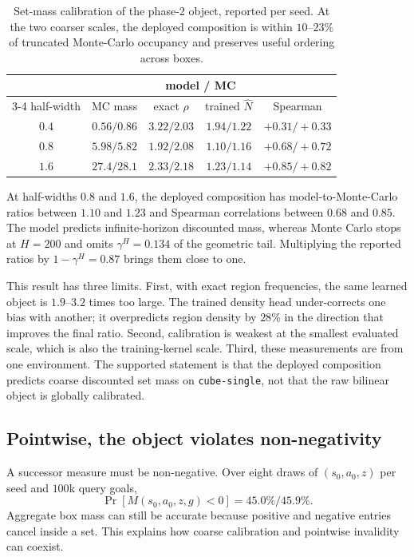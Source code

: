 \documentclass{article}
\begin{document}
\begin{table}[t]
\centering\small
\begin{tabular}{c c c c c}
\toprule
& & \multicolumn{2}{c}{model / MC} & \\
\cmidrule(lr){3-4}
half-width & MC mass & exact $\rho$ & trained $\hat N$ & Spearman \\
\midrule
$0.4$ & $0.56/0.86$ & $3.22/2.03$ & $1.94/1.22$ & $+0.31/+0.33$ \\
$0.8$ & $5.98/5.82$ & $1.92/2.08$ & $\mathbf{1.10/1.16}$ & $+0.68/+0.72$ \\
$1.6$ & $27.4/28.1$ & $2.33/2.18$ & $\mathbf{1.23/1.14}$ & $+0.85/+0.82$ \\
\bottomrule
\end{tabular}
\caption{Set-mass calibration of the phase-2 object, reported per seed. At the
two coarser scales, the deployed composition is within $10$--$23\%$ of truncated
Monte-Carlo occupancy and preserves useful ordering across boxes.}
\label{tab:calib}
\end{table}

At half-widths $0.8$ and $1.6$, the deployed composition has model-to-Monte-Carlo
ratios between $1.10$ and $1.23$ and Spearman correlations between $0.68$ and
$0.85$. The model predicts infinite-horizon discounted mass, whereas Monte Carlo
stops at $H=200$ and omits $\gamma^H=0.134$ of the geometric tail. Multiplying the
reported ratios by $1-\gamma^H=0.87$ brings them close to one.

This result has three limits. First, with exact region frequencies, the same
learned object is $1.9$--$3.2$ times too large. The trained density head
under-corrects one bias with another; it overpredicts region density by $28\%$ in
the direction that improves the final ratio. Second, calibration is weakest at
the smallest evaluated scale, which is also the training-kernel scale. Third,
these measurements are from one environment. The supported statement is that the
deployed composition predicts coarse discounted set mass on
\texttt{cube-single}, not that the raw bilinear object is globally calibrated.

\subsection{Pointwise, the object violates non-negativity}

A successor measure must be non-negative. Over eight draws of $(s_0,a_0,z)$ per
seed and $100$k query goals,
\begin{equation}
\Pr[M(s_0,a_0,z,g)<0]=45.0\%/45.9\%.
\end{equation}
Aggregate box mass can still be accurate because positive and negative entries
cancel inside a set. This explains how coarse calibration and pointwise invalidity
can coexist.
\end{document}
